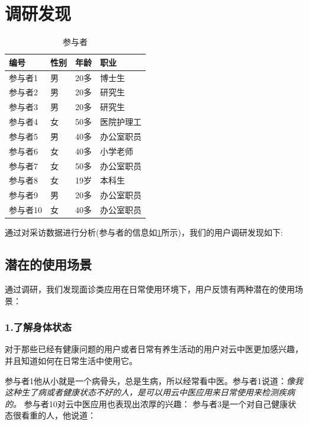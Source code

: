\section{调研发现}
\begin{table}
  
  \centering
  \label{tab:Participants}
  \begin{tabular}{llll}
        \toprule
        编号 &	性别 &	年龄 &	职业 \\
        \midrule
        参与者1 &	男 &	20多 &	博士生 \\
        参与者2 &	男 &	20多 &	研究生 \\
        参与者3 &	男 &	20多 &	研究生 \\
        参与者4 &	女 &	50多 &	医院护理工 \\
        参与者5 &	男 &	40多 &	办公室职员 \\
        参与者6 &	女 &	40多 &	小学老师 \\
        参与者7 &	女 &	50多 &	办公室职员 \\
        参与者8 &	女 &	19岁 &	本科生 \\
        参与者9 &	男 &	20多 &	办公室职员 \\
        参与者10 &	女 &	40多 &	办公室职员 \\
        \bottomrule
  \end{tabular}
  \caption{参与者}
\end{table}
通过对采访数据进行分析(参与者的信息如\ref{tab:Participants}所示)，我们的用户调研发现如下:
\subsection{潜在的使用场景}
通过调研，我们发现面诊类应用在日常使用环境下，用户反馈有两种潜在的使用场景：

\subsubsection{1.了解身体状态}

对于那些已经有健康问题的用户或者日常有养生活动的用户对云中医更加感兴趣，并且知道如何在日常生活中使用它。

参与者1他从小就是一个病骨头，总是生病，所以经常看中医。参与者1说道：\emph{像我这种生了病或者健康状态不好的人，是可以用云中医应用来日常使用来检测疾病的。}
参与者10对云中医应用也表现出浓厚的兴趣：
参与者3是一个对自己健康状态很看重的人，他说道：

